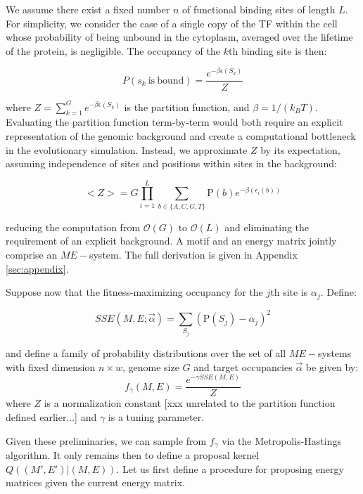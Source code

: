 \documentclass{article}
\renewcommand{\P}{\mathrm{P}}
\begin{document}
We assume there exist a fixed number $n$ of functional binding sites
of length $L$.  For simplicity, we consider the case of a single copy
of the TF within the cell whose probability of being unbound in the
cytoplasm, averaged over the lifetime of the protein, is negligible.
The occupancy of the $k$th binding site is then:

\begin{equation}
  \label{eq:occupancy}
  P(s_k \mathrm{\ is\ bound}) = \frac{e^{-\beta\epsilon(S_k)}}{Z}
\end{equation}

where $Z = \sum_{k=1}^Ge^{-\beta\epsilon(S_k)}$ is the partition
function, and $\beta = 1/(k_BT)$.  Evaluating the partition function term-by-term would both
require an explicit representation of the genomic background and
create a computational bottleneck in the evolutionary simulation.
Instead, we approximate $Z$ by its expectation, assuming independence
of sites and positions within sites in the background:

\begin{equation}
  <Z> = G\prod_{i=1}^L\sum_{b\in\{A,C,G,T\}}\P(b)e^{-\beta(\epsilon_i(b))}
\end{equation}

reducing the computation from $\mathcal{O}(G)$ to $\mathcal{O}(L)$ and
eliminating the requirement of an explicit background.  A motif and an
energy matrix jointly comprise an $ME-$system. The full derivation is
given in Appendix \ref{sec:appendix}.

Suppose now that the fitness-maximizing occupancy for the $j$th site
is $\alpha_j$.  Define:

\begin{equation}
  \label{eq:sse}
  SSE(M,E;\vec\alpha) = \sum_{S_j}(\P(S_j) - \alpha_j)^2
\end{equation}

and define a family of probability distributions over the set of all
$ME-$systems with fixed dimension $n\times w$, genome size $G$ and
target occupancies $\vec\alpha$ be given by:
\begin{equation}
  \label{eq:me_fitness}
  f_\gamma(M,E) = \frac{e^{-\gamma SSE(M,E)}}{Z}
\end{equation}
where $Z$ is a normalization constant [xxx unrelated to the partition
function defined earlier...] and $\gamma$ is a tuning parameter.

Given these preliminaries, we can sample from $f_\gamma$ via the
Metropolis-Hastings algorithm.  It only remains then to define a
proposal kernel $Q((M',E')|(M,E))$.  Let us first define a procedure
for proposing energy matrices given the current energy matrix.
\end{document}
